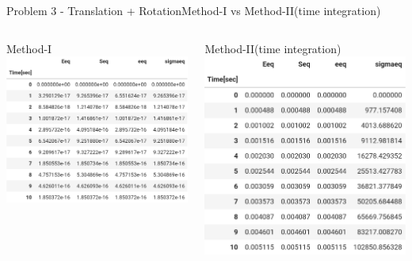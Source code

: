 \documentclass{beamer}
\begin{document}
\begin{frame}{Problem 3 - Translation + Rotation}{Method-I vs Method-II(time integration)}
    \vspace{-2em}
    \begin{columns}
        \begin{block}{\footnotesize Method-I}
            \includegraphics[width=\textwidth]{Values/m2t3.png}
        \end{block}
        \begin{block}{\footnotesize Method-II(time integration)}
            \includegraphics[width=\textwidth]{Values/m1t3.png}
        \end{block}
    \end{columns}
\end{frame}
\end{document}
